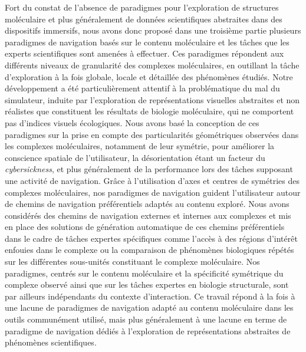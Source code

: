 
Fort du constat de l'absence de paradigmes pour l'exploration de structures moléculaire et plus généralement de données scientifiques abstraites dans des dispositifs immersifs, nous avons donc proposé dans une troisième partie plusieurs paradigmes de navigation basés sur le contenu moléculaire et les tâches que les experts scientifiques sont amenées à effectuer. Ces paradigmes répondent aux différents niveaux de granularité des complexes moléculaires, en outillant la tâche d'exploration à la fois globale, locale et détaillée des phénomènes étudiés. Notre développement a été particulièrement attentif à la problématique du mal du simulateur, induite par l'exploration de représentations visuelles abstraites et non réalistes que constituent les résultats de biologie moléculaire, qui ne comportent pas d'indices visuels écologiques. Nous avons basé la conception de ces paradigmes sur la prise en compte des particularités géométriques observées dans les complexes moléculaires, notamment de leur symétrie, pour améliorer la conscience spatiale de l'utilisateur, la désorientation étant un facteur du \textit{cybersickness}, et plus généralement de la performance lors des tâches supposant une activité de navigation. Grâce à l'utilisation d'axes et centres de symétries des complexes moléculaires, nos paradigmes de navigation guident l'utilisateur autour de chemins de navigation préférentiels adaptés au contenu exploré. Nous avons considérés des chemins de navigation externes et internes aux complexes et mis en place des solutions de génération automatique de ces chemins préférentiels dans le cadre de tâches expertes spécifiques comme l'accès à des régions d'intérêt enfouies dans le complexe ou la comparaison de phénomènes biologiques répétés sur les différentes sous-unités constituant le complexe moléculaire.
Nos paradigmes, centrés sur le contenu moléculaire et la spécificité symétrique du complexe observé ainsi que sur les tâches expertes en biologie structurale, sont par ailleurs indépendants du contexte d'interaction. Ce travail répond à la fois à une lacune de paradigmes de navigation adapté au contenu moléculaire dans les outils communément utilisé, mais plus généralement à une lacune en terme de paradigme de navigation dédiés à l'exploration de représentations abstraites de phénomènes scientifiques. 


